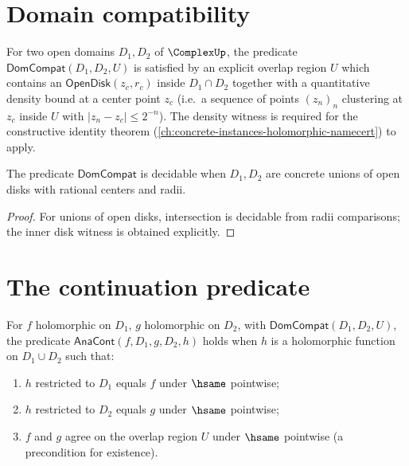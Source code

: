 \section{Domain compatibility}

\begin{definition}
\label{def:dom-compat}
For two open domains \(D_1, D_2\) of \(\ComplexUp\), the predicate \(\mathsf{DomCompat}(D_1, D_2, U)\) is satisfied by an explicit overlap region \(U\) which contains an \(\mathsf{OpenDisk}(z_c, r_c)\) inside \(D_1 \cap D_2\) together with a quantitative density bound at a center point \(z_c\) (i.e.\ a sequence of points \((z_n)_n\) clustering at \(z_c\) inside \(U\) with \(|z_n - z_c| \leq 2^{-n}\)). The density witness is required for the constructive identity theorem (\autoref{ch:concrete-instances-holomorphic-namecert}) to apply.
\end{definition}

\begin{lemma}
\label{lem:dom-compat-witness}
The predicate \(\mathsf{DomCompat}\) is decidable when \(D_1, D_2\) are concrete unions of open disks with rational centers and radii.
\end{lemma}
\begin{proof}
For unions of open disks, intersection is decidable from radii comparisons; the inner disk witness is obtained explicitly.
\end{proof}

\section{The continuation predicate}

\begin{definition}
\label{def:ana-cont}
For \(f\) holomorphic on \(D_1\), \(g\) holomorphic on \(D_2\), with \(\mathsf{DomCompat}(D_1, D_2, U)\), the predicate \(\mathsf{AnaCont}(f, D_1, g, D_2, h)\) holds when \(h\) is a holomorphic function on \(D_1 \cup D_2\) such that:
\begin{enumerate}
  \item \(h\) restricted to \(D_1\) equals \(f\) under \(\hsame\) pointwise;
  \item \(h\) restricted to \(D_2\) equals \(g\) under \(\hsame\) pointwise;
  \item \(f\) and \(g\) agree on the overlap region \(U\) under \(\hsame\) pointwise (a precondition for existence).
\end{enumerate}
\end{definition}

